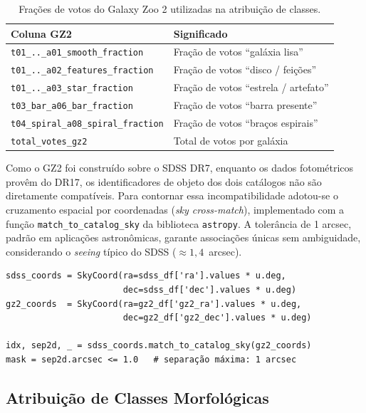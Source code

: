 \documentclass[12pt, a4paper]{article}
\begin{document}
\begin{table}[H]
  \centering
  \caption{Frações de votos do Galaxy Zoo 2 utilizadas na atribuição de classes.}
  \label{tab:gz2_cols}
  \begin{tabular}{lp{9cm}}
    \toprule
    \textbf{Coluna GZ2} & \textbf{Significado} \\
    \midrule
    \texttt{t01\_..\_a01\_smooth\_fraction}   & Fração de votos ``galáxia lisa'' \\
    \texttt{t01\_..\_a02\_features\_fraction} & Fração de votos ``disco / feições'' \\
    \texttt{t01\_..\_a03\_star\_fraction}     & Fração de votos ``estrela / artefato'' \\
    \texttt{t03\_bar\_a06\_bar\_fraction}     & Fração de votos ``barra presente'' \\
    \texttt{t04\_spiral\_a08\_spiral\_fraction} & Fração de votos ``braços espirais'' \\
    \texttt{total\_votes\_gz2}               & Total de votos por galáxia \\
    \bottomrule
  \end{tabular}
\end{table}

Como o GZ2 foi construído sobre o SDSS DR7, enquanto os dados fotométricos
provêm do DR17, os identificadores de objeto dos dois catálogos não são
diretamente compatíveis. Para contornar essa incompatibilidade adotou-se o
cruzamento espacial por coordenadas (\textit{sky cross-match}), implementado
com a função \texttt{match\_to\_catalog\_sky} da biblioteca \texttt{astropy}.
A tolerância de 1 arcsec, padrão em aplicações astronômicas, garante
associações únicas sem ambiguidade, considerando o \textit{seeing} típico do
SDSS ($\approx 1{,}4$~arcsec).

\begin{lstlisting}[caption={Cruzamento espacial entre SDSS e GZ2.}, label=lst:crossmatch]
sdss_coords = SkyCoord(ra=sdss_df['ra'].values * u.deg,
                       dec=sdss_df['dec'].values * u.deg)
gz2_coords  = SkyCoord(ra=gz2_df['gz2_ra'].values * u.deg,
                       dec=gz2_df['gz2_dec'].values * u.deg)

idx, sep2d, _ = sdss_coords.match_to_catalog_sky(gz2_coords)
mask = sep2d.arcsec <= 1.0   # separação máxima: 1 arcsec
\end{lstlisting}

\subsection{Atribuição de Classes Morfológicas}
\end{document}
